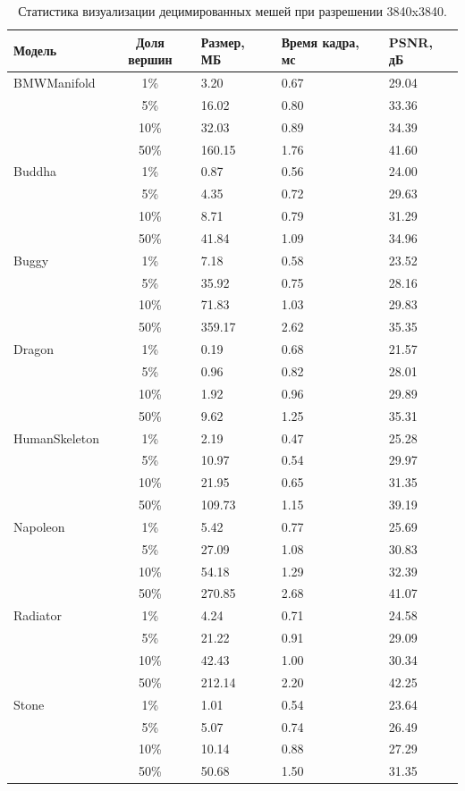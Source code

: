 \begin{table}[htbp]
  \centering
  \scriptsize
  \caption{Статистика визуализации децимированных мешей при разрешении 3840x3840.}
  \label{tab:decimated_stats_3840}
  \begin{tabular}{lcp{2cm}p{2.5cm}p{2.5cm}}
    \toprule
    \textbf{Модель} & \textbf{Доля вершин} & \textbf{Размер, МБ} & \textbf{Время кадра, мс} & \textbf{PSNR, дБ} \\
\midrule
    BMWManifold & 1\% & 3.20 & 0.67 & 29.04 \\
     & 5\% & 16.02 & 0.80 & 33.36 \\
     & 10\% & 32.03 & 0.89 & 34.39 \\
     & 50\% & 160.15 & 1.76 & 41.60 \\
    \midrule
    Buddha & 1\% & 0.87 & 0.56 & 24.00 \\
     & 5\% & 4.35 & 0.72 & 29.63 \\
     & 10\% & 8.71 & 0.79 & 31.29 \\
     & 50\% & 41.84 & 1.09 & 34.96 \\
    \midrule
    Buggy & 1\% & 7.18 & 0.58 & 23.52 \\
     & 5\% & 35.92 & 0.75 & 28.16 \\
     & 10\% & 71.83 & 1.03 & 29.83 \\
     & 50\% & 359.17 & 2.62 & 35.35 \\
    \midrule
    Dragon & 1\% & 0.19 & 0.68 & 21.57 \\
     & 5\% & 0.96 & 0.82 & 28.01 \\
     & 10\% & 1.92 & 0.96 & 29.89 \\
     & 50\% & 9.62 & 1.25 & 35.31 \\
    \midrule
    HumanSkeleton & 1\% & 2.19 & 0.47 & 25.28 \\
     & 5\% & 10.97 & 0.54 & 29.97 \\
     & 10\% & 21.95 & 0.65 & 31.35 \\
     & 50\% & 109.73 & 1.15 & 39.19 \\
    \midrule
    Napoleon & 1\% & 5.42 & 0.77 & 25.69 \\
     & 5\% & 27.09 & 1.08 & 30.83 \\
     & 10\% & 54.18 & 1.29 & 32.39 \\
     & 50\% & 270.85 & 2.68 & 41.07 \\
    \midrule
    Radiator & 1\% & 4.24 & 0.71 & 24.58 \\
     & 5\% & 21.22 & 0.91 & 29.09 \\
     & 10\% & 42.43 & 1.00 & 30.34 \\
     & 50\% & 212.14 & 2.20 & 42.25 \\
    \midrule
    Stone & 1\% & 1.01 & 0.54 & 23.64 \\
     & 5\% & 5.07 & 0.74 & 26.49 \\
     & 10\% & 10.14 & 0.88 & 27.29 \\
     & 50\% & 50.68 & 1.50 & 31.35 \\
    \bottomrule
  \end{tabular}
\end{table}

